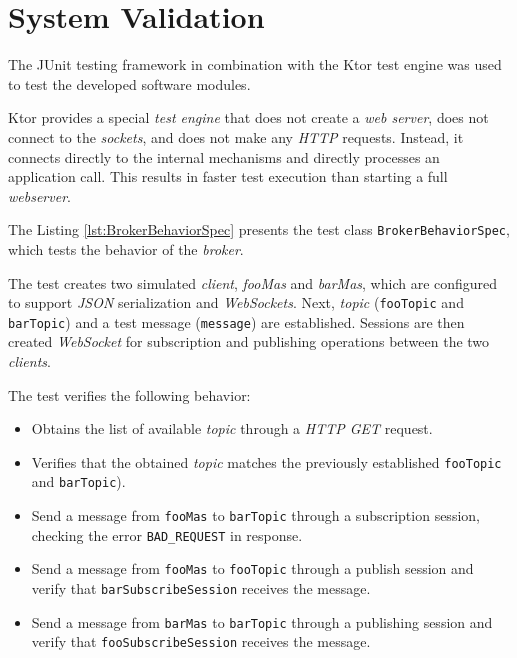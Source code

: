 \section{System Validation}
The JUnit testing framework in combination with the Ktor test engine was used to test the developed software modules.

Ktor provides a special \textit{test engine} that does not create a \textit{web server}, does not connect to the \textit{sockets}, and does not make any \textit{HTTP} requests. Instead, it connects directly to the internal mechanisms and directly processes an application call. This results in faster test execution than starting a full \textit{webserver}.

The Listing \ref{lst:BrokerBehaviorSpec} presents the test class \texttt{BrokerBehaviorSpec}, which tests the behavior of the \textit{broker}.

The test creates two simulated \textit{client}, \textit{fooMas} and \textit{barMas}, which are configured to support \textit{JSON} serialization and \textit{WebSockets}. Next, \textit{topic} (\texttt{fooTopic} and \texttt{barTopic}) and a test message (\texttt{message}) are established. Sessions are then created \textit{WebSocket} for subscription and publishing operations between the two \textit{clients}.

The test verifies the following behavior:

\begin{itemize}
    \item Obtains the list of available \textit{topic} through a \textit{HTTP GET} request.
    \item Verifies that the obtained \textit{topic} matches the previously established \texttt{fooTopic} and \texttt{barTopic}).
    \item Send a message from \texttt{fooMas} to \texttt{barTopic} through a subscription session, checking the error \texttt{BAD\_REQUEST} in response.
    \item Send a message from \texttt{fooMas} to \texttt{fooTopic} through a publish session and verify that \texttt{barSubscribeSession} receives the message.
    \item Send a message from \texttt{barMas} to \texttt{barTopic} through a publishing session and verify that \texttt{fooSubscribeSession} receives the message.
\end{itemize}

